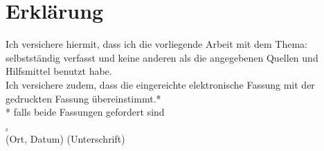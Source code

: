 \section*{Erklärung}
Ich versichere hiermit, dass ich die vorliegende Arbeit mit dem Thema: \emph{\thetitle} selbstständig verfasst und keine anderen als die angegebenen Quellen und Hilfsmittel benutzt habe. \\

Ich versichere zudem, dass die eingereichte elektronische Fassung mit der gedruckten Fassung übereinstimmt.* \\

* falls beide Fassungen gefordert sind
$\;$ \\
$\;$ \\
$\;$ \\
$\;$ \\
$\;$ \\
\underline{\universityCity, \dayOfCompletion \hspace{5mm}} \hspace{55mm} 
\underline{\hspace{50mm}} \\

(Ort, Datum) \hspace{75mm} (Unterschrift)


